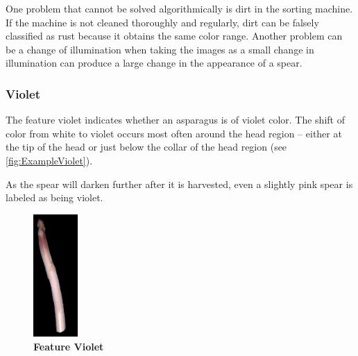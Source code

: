 \bigskip
One problem that cannot be solved algorithmically is dirt in the sorting machine. If the machine is not cleaned thoroughly and regularly, dirt can be falsely classified as rust because it obtains the same color range. Another problem can be a change of illumination when taking the images as a small change in illumination can produce a large change in the appearance of a spear.


\subsubsection{Violet}
\label{subsec:Violet}

The feature violet indicates whether an asparagus is of violet color.
The shift of color from white to violet occurs most often around the head region -- either at the tip of the head or just below the collar of the head region (see \autoref{fig:ExampleViolet}).

As the spear will darken further after it is harvested, even a slightly pink spear is labeled as being violet.

\begin{figure}
  \begin{center}
    \includegraphics[width=0.15\textwidth]{Figures/chapter03/example_img_violet.png}
  \end{center}
  \vspace{-15pt}
  \caption[Example Image Feature Violet]{ \textbf{Feature Violet}}
  \label{fig:ExampleViolet}
\end{figure}

